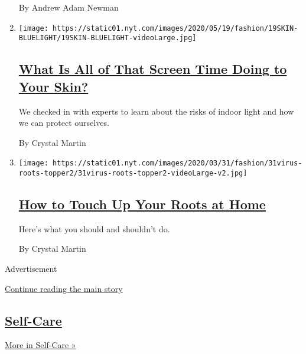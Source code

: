 \begin{enumerate}
  By Andrew Adam Newman
\item
  \texttt{[image: https://static01.nyt.com/images/2020/05/19/fashion/19SKIN-BLUELIGHT/19SKIN-BLUELIGHT-videoLarge.jpg]}

  \hypertarget{what-is-all-of-that-screen-time-doing-to-your-skin}{%
  \subsection{\texorpdfstring{\href{/2020/05/20/style/skin-damage-blue-light-what-is-all-of-that-screen-time-doing-to-your-skin.html}{What
  Is All of That Screen Time Doing to Your
  Skin?}}{What Is All of That Screen Time Doing to Your Skin?}}\label{what-is-all-of-that-screen-time-doing-to-your-skin}}

  We checked in with experts to learn about the risks of indoor light
  and how we can protect ourselves.

  By Crystal Martin
\item
  \texttt{[image: https://static01.nyt.com/images/2020/03/31/fashion/31virus-roots-topper2/31virus-roots-topper2-videoLarge-v2.jpg]}

  \hypertarget{how-to-touch-up-your-roots-at-home}{%
  \subsection{\texorpdfstring{\href{/2020/03/31/style/how-to-touch-up-your-roots-at-home.html}{How
  to Touch Up Your Roots at
  Home}}{How to Touch Up Your Roots at Home}}\label{how-to-touch-up-your-roots-at-home}}

  Here's what you should and shouldn't do.

  By Crystal Martin
\end{enumerate}

Advertisement

\protect\hyperlink{after-mid3}{Continue reading the main story}

\hypertarget{self-care}{%
\subsection{\texorpdfstring{\href{/section/style/self-care}{Self-Care}}{Self-Care}}\label{self-care}}

\href{/section/style/self-care}{More in Self-Care »}

